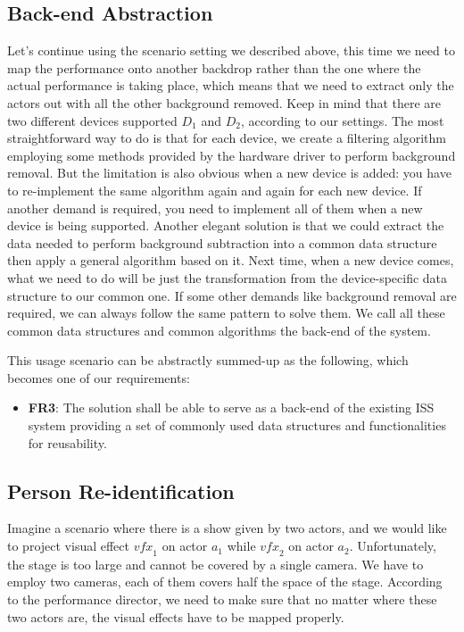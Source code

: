 \subsection{Back-end Abstraction}
\label{sec:intro-sq-abs}

Let's continue using the scenario setting we described above, this time we need
to map the performance onto another backdrop rather than the one where the
actual performance is taking place, which means that we need to extract only
the actors out with all the other background removed. Keep in mind that
there are two different devices supported $D_1$ and $D_2$, according to our
settings. The most straightforward way to do is that for each device, we
create a filtering algorithm employing some methods provided by the hardware
driver to perform background removal. But the limitation is also obvious when
a new device is added: you have to re-implement the same algorithm again and
again for each new device. If another demand is required, you need to implement 
all of them when a new device is being supported.
Another elegant solution is that we could extract the data needed to perform
background subtraction into a common data structure then apply a general
algorithm based on it. Next time, when a new device comes, what we need to do
will be just the transformation from the device-specific data structure to our
common one. If some other demands like background removal are required, we can
always follow the same pattern to solve them. We call all these common data 
structures and common algorithms the back-end of the system.

This usage scenario can be abstractly summed-up as the following, which becomes
one of our requirements:

\begin{itemize}
    \item \textbf{FR3}: The solution shall be able to serve as a back-end of the
	existing ISS system providing a set of commonly used data structures and
	functionalities for reusability.
\end{itemize}

\subsection{Person Re-identification}
\label{sec:intro-sq-reid}

Imagine a scenario where there is a show given by two actors, and we would like
to project visual effect $\mathit{vfx}_1$ on actor $a_1$ while $\mathit{vfx}_2$
on actor $a_2$.
Unfortunately, the stage is too large and cannot be covered by a single camera.
We have to employ two cameras, each of them covers half the space of the stage.
According to the performance director, we need to make sure that no matter
where these two actors are, the visual effects have to be mapped properly.

